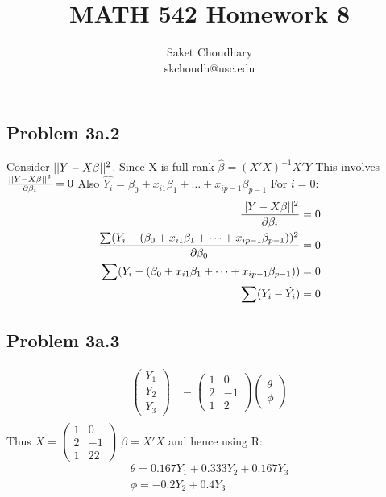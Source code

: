 \documentclass[a4paper]{article}
\title{MATH 542 Homework 8}
\author{Saket Choudhary\\skchoudh@usc.edu}
\begin{document}
\maketitle 
\subsection*{Problem 3a.2}
Consider $||\boldmath{Y}-\boldmath{X\beta}||^2$.  Since X is full rank $\hat{\beta} = (X'X)^{-1}X'Y$
This involves $\frac{||\boldmath{Y}-\boldmath{X\beta}||^2}{\partial \beta_i}=0$
Also $\hat{Y_i}=\beta_0+x_{i1}\beta_1 + \dots + x_{ip-1}\beta_{p-1} $
For $i=0$:
\begin{align*}
\frac{||\boldmath{Y}-\boldmath{X\beta}||^2}{\partial \beta_i}&=0\\
\frac{\sum( Y_i-(\beta_0+x_{i1}\beta_1 + \dots + x_{ip-1}\beta_{p-1} ) )^2 }{\partial \beta_0} &= 0\\
\sum( Y_i-(\beta_0+x_{i1}\beta_1 + \dots + x_{ip-1}\beta_{p-1} ) ) &= 0\\
\sum( Y_i-\hat{Y_i} ) &= 0\\
\end{align*}
\subsection*{Problem 3a.3}
\begin{align*}
\begin{pmatrix}Y_1\\Y_2\\Y_3
\end{pmatrix}&= \begin{pmatrix}1 &0\\ 2 & -1\\ 1 & 2\end{pmatrix}\begin{pmatrix}\theta\\ \phi \end{pmatrix}\\
\end{align*}
Thus $X=\begin{pmatrix}1 &0\\ 2 & -1\\ 1 & 22\end{pmatrix}$
$\beta=X'X$ and hence using R:
\begin{align*}
\theta = 0.167 Y_1 + 0.333 Y_2 + 0.167 Y_3\\
\phi = -0.2Y_2+0.4Y_3
\end{align*}
\end{document}
